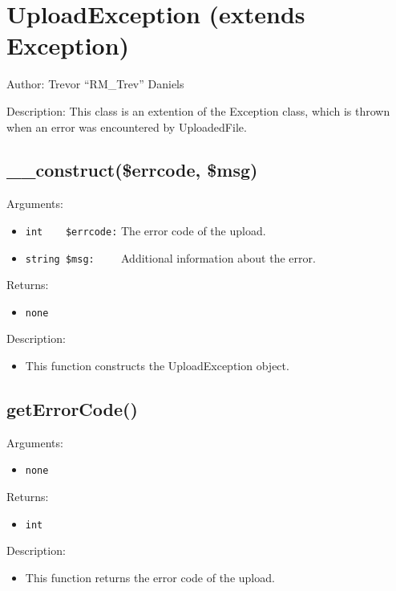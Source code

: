 \documentclass[10pt]{article}
\begin{document}

\pagebreak
\section{UploadException (extends Exception)}
\noindent Author: Trevor ``RM\_Trev'' Daniels

\noindent Description: This class is an extention of the Exception class, which is thrown when an error was encountered by UploadedFile.


\subsection{\_\_construct(\$errcode, \$msg)}

\noindent Arguments:
\begin{itemize}
\item \verb!int    $errcode:! The error code of the upload.
\item \verb!string $msg:    ! Additional information about the error.
\end{itemize}

\noindent Returns:
\begin{itemize}
\item \verb!none!
\end{itemize}

\noindent Description:
\begin{itemize}
\item This function constructs the UploadException object.
\end{itemize}


\subsection{getErrorCode()}

\noindent Arguments:
\begin{itemize}
\item \verb!none!
\end{itemize}

\noindent Returns:
\begin{itemize}
\item \verb!int!
\end{itemize}

\noindent Description:
\begin{itemize}
\item This function returns the error code of the upload.
\end{itemize}
\end{document}
